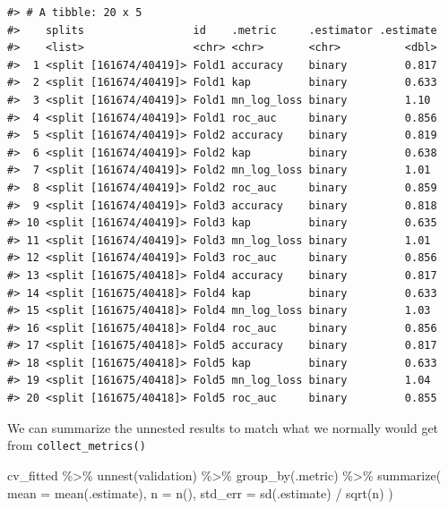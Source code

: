 \documentclass[
]{krantz}
\makeatletter
\newenvironment{Shaded}{\begin{snugshade}}{\end{snugshade}}
\newcommand{\AttributeTok}[1]{\textcolor[rgb]{0.77,0.63,0.00}{#1}}
\newcommand{\FunctionTok}[1]{\textcolor[rgb]{0.00,0.00,0.00}{#1}}
\newcommand{\NormalTok}[1]{#1}
\newcommand{\SpecialCharTok}[1]{\textcolor[rgb]{0.00,0.00,0.00}{#1}}
\newenvironment{kframe}{%
\medskip{}
\setlength{\fboxsep}{.8em}
 \def\at@end@of@kframe{}%
 \ifinner\ifhmode%
  \def\at@end@of@kframe{\end{minipage}}%
  \begin{minipage}{\columnwidth}%
 \fi\fi%
 \def\FrameCommand##1{\hskip\@totalleftmargin \hskip-\fboxsep
 \colorbox{shadecolor}{##1}\hskip-\fboxsep
     \hskip-\linewidth \hskip-\@totalleftmargin \hskip\columnwidth}%
 \MakeFramed {\advance\hsize-\width
   \@totalleftmargin\z@ \linewidth\hsize
   \@setminipage}}%
 {\par\unskip\endMakeFramed%
 \at@end@of@kframe}
\renewenvironment{Shaded}{\begin{kframe}}{\end{kframe}}
\makeatother
\begin{document}
\begin{verbatim}
#> # A tibble: 20 x 5
#>    splits                 id    .metric     .estimator .estimate
#>    <list>                 <chr> <chr>       <chr>          <dbl>
#>  1 <split [161674/40419]> Fold1 accuracy    binary         0.817
#>  2 <split [161674/40419]> Fold1 kap         binary         0.633
#>  3 <split [161674/40419]> Fold1 mn_log_loss binary         1.10 
#>  4 <split [161674/40419]> Fold1 roc_auc     binary         0.856
#>  5 <split [161674/40419]> Fold2 accuracy    binary         0.819
#>  6 <split [161674/40419]> Fold2 kap         binary         0.638
#>  7 <split [161674/40419]> Fold2 mn_log_loss binary         1.01 
#>  8 <split [161674/40419]> Fold2 roc_auc     binary         0.859
#>  9 <split [161674/40419]> Fold3 accuracy    binary         0.818
#> 10 <split [161674/40419]> Fold3 kap         binary         0.635
#> 11 <split [161674/40419]> Fold3 mn_log_loss binary         1.01 
#> 12 <split [161674/40419]> Fold3 roc_auc     binary         0.856
#> 13 <split [161675/40418]> Fold4 accuracy    binary         0.817
#> 14 <split [161675/40418]> Fold4 kap         binary         0.633
#> 15 <split [161675/40418]> Fold4 mn_log_loss binary         1.03 
#> 16 <split [161675/40418]> Fold4 roc_auc     binary         0.856
#> 17 <split [161675/40418]> Fold5 accuracy    binary         0.817
#> 18 <split [161675/40418]> Fold5 kap         binary         0.633
#> 19 <split [161675/40418]> Fold5 mn_log_loss binary         1.04 
#> 20 <split [161675/40418]> Fold5 roc_auc     binary         0.855
\end{verbatim}

We can summarize the unnested results to match what we normally would get from \texttt{collect\_metrics()}

\begin{Shaded}
\begin{Highlighting}[]
\NormalTok{cv\_fitted }\SpecialCharTok{\%\textgreater{}\%}
  \FunctionTok{unnest}\NormalTok{(validation) }\SpecialCharTok{\%\textgreater{}\%}
  \FunctionTok{group\_by}\NormalTok{(.metric) }\SpecialCharTok{\%\textgreater{}\%}
  \FunctionTok{summarize}\NormalTok{(}
    \AttributeTok{mean =} \FunctionTok{mean}\NormalTok{(.estimate),}
    \AttributeTok{n =} \FunctionTok{n}\NormalTok{(),}
    \AttributeTok{std\_err =} \FunctionTok{sd}\NormalTok{(.estimate) }\SpecialCharTok{/} \FunctionTok{sqrt}\NormalTok{(n)}
\NormalTok{  )}
\end{Highlighting}
\end{Shaded}
\end{document}
